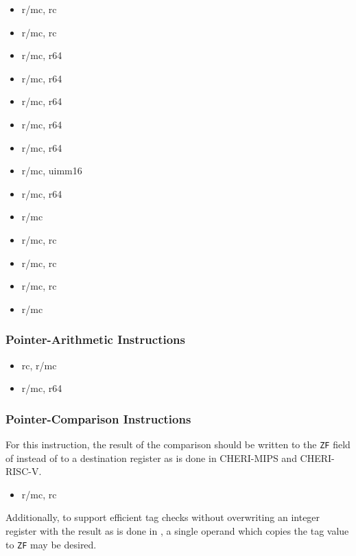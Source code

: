 \begin{itemize}
  \item {} r/mc, rc
  \item {} r/mc, rc
  \item {} r/mc, r64
  \item {} r/mc, r64
  \item {} r/mc, r64
  \item {} r/mc, r64
  \item {} r/mc, r64
  \item {} r/mc, uimm16
  \item {} r/mc, r64
  \item {} r/mc
  \item {} r/mc, rc
  \item {} r/mc, rc
  \item {} r/mc, rc
  \item {} r/mc
\end{itemize}

\subsubsection{Pointer-Arithmetic Instructions}

\begin{itemize}
  \item {} rc, r/mc
  \item {} r/mc, r64
\end{itemize}

\subsubsection{Pointer-Comparison Instructions}

For this instruction, the result of the comparison should be written
to the \texttt{ZF} field of \RFLAGS{} instead of to a destination
register as is done in CHERI-MIPS and CHERI-RISC-V.

\begin{itemize}
  \item {} r/mc, rc
\end{itemize}

Additionally, to support efficient tag checks without overwriting an
integer register with the result as is done in , a
single operand  which copies the tag value to
\texttt{ZF} may be desired.

